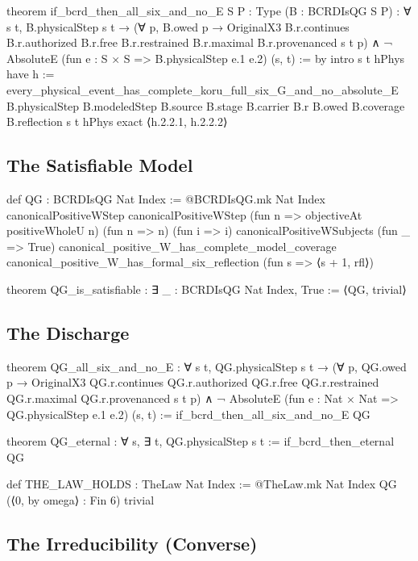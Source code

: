 \documentclass[11pt,a4paper]{article}
\theoremstyle{definition}
\theoremstyle{remark}
\begin{document}
\begin{leancode}
theorem if_bcrd_then_all_six_and_no_E {S P : Type}
    (B : BCRDIsQG S P) :
    ∀ s t, B.physicalStep s t →
      (∀ p, B.owed p →
        OriginalX3 B.r.continues B.r.authorized B.r.free
          B.r.restrained B.r.maximal B.r.provenanced s t p) ∧
      ¬ AbsoluteE
        (fun e : S × S => B.physicalStep e.1 e.2) (s, t) := by
  intro s t hPhys
  have h := every_physical_event_has_complete_koru_full_six_G_and_no_absolute_E
    B.physicalStep B.modeledStep B.source B.stage B.carrier B.r B.owed
    B.coverage B.reflection s t hPhys
  exact ⟨h.2.2.1, h.2.2.2⟩
\end{leancode}

\subsection{The Satisfiable Model}

\begin{leancode}
def QG : BCRDIsQG Nat Index :=
  @BCRDIsQG.mk Nat Index
    canonicalPositiveWStep canonicalPositiveWStep
    (fun n => objectiveAt positiveWholeU n)
    (fun n => n) (fun i => i)
    canonicalPositiveWSubjects
    (fun _ => True)
    canonical_positive_W_has_complete_model_coverage
    canonical_positive_W_has_formal_six_reflection
    (fun s => ⟨s + 1, rfl⟩)

theorem QG_is_satisfiable : ∃ _ : BCRDIsQG Nat Index, True :=
  ⟨QG, trivial⟩
\end{leancode}

\subsection{The Discharge}

\begin{leancode}
theorem QG_all_six_and_no_E :
    ∀ s t, QG.physicalStep s t →
      (∀ p, QG.owed p → OriginalX3 QG.r.continues QG.r.authorized
        QG.r.free QG.r.restrained QG.r.maximal QG.r.provenanced s t p) ∧
      ¬ AbsoluteE (fun e : Nat × Nat => QG.physicalStep e.1 e.2) (s, t) :=
  if_bcrd_then_all_six_and_no_E QG

theorem QG_eternal : ∀ s, ∃ t, QG.physicalStep s t :=
  if_bcrd_then_eternal QG

def THE_LAW_HOLDS : TheLaw Nat Index :=
  @TheLaw.mk Nat Index QG (⟨0, by omega⟩ : Fin 6) trivial
\end{leancode}

\subsection{The Irreducibility (Converse)}\label{thm:irreducible}
\end{document}
